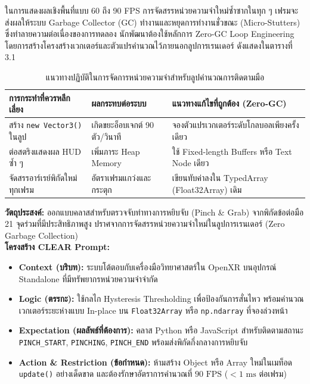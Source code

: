 ในการแสดงผลเชิงพื้นที่แบบ 60 ถึง 90 FPS การจัดสรรหน่วยความจำใหม่ซ้ำซากในทุก ๆ เฟรมจะส่งผลให้ระบบ Garbage Collector (GC) ทำงานและหยุดการทำงานชั่วขณะ (Micro-Stutters) ซึ่งทำลายความต่อเนื่องของการทดลอง นักพัฒนาต้องใช้หลักการ Zero-GC Loop Engineering โดยการสร้างโครงสร้างเวกเตอร์และตัวแปรคำนวณไว้ภายนอกลูปการเรนเดอร์ ดังแสดงในตารางที่ 3.1

\begin{table}[htbp]
\centering
\caption{แนวทางปฏิบัติในการจัดการหน่วยความจำสำหรับลูปคำนวณการติดตามมือ}
\label{tab:zero_gc_rules}
\begin{tabularx}{\textwidth}{lYY}
\toprule
\textbf{การกระทำที่ควรหลีกเลี่ยง} & \textbf{ผลกระทบต่อระบบ} & \textbf{แนวทางแก้ไขที่ถูกต้อง (Zero-GC)} \\
\midrule
สร้าง \texttt{new Vector3()} ในลูป & เกิดขยะอ็อบเจกต์ 90 ตัว/วินาที & จองตัวแปรเวกเตอร์ระดับโกลบอลเพียงครั้งเดียว \\
ต่อสตริงแสดงผล HUD ซ้ำ ๆ & เพิ่มภาระ Heap Memory & ใช้ Fixed-length Buffers หรือ Text Node เดียว \\
จัดสรรอาร์เรย์พิกัดใหม่ทุกเฟรม & อัตราเฟรมแกว่งและกระตุก & เขียนทับค่าลงใน TypedArray (Float32Array) เดิม \\
\bottomrule
\end{tabularx}
\end{table}

\begin{aipromptbox}
\textbf{วัตถุประสงค์:} ออกแบบคลาสสำหรับตรวจจับท่าทางการหยิบจับ (Pinch \& Grab) จากพิกัดข้อต่อมือ 21 จุดร่วมที่มีประสิทธิภาพสูง ปราศจากการจัดสรรหน่วยความจำใหม่ในลูปการเรนเดอร์ (Zero Garbage Collection)\\
\textbf{โครงสร้าง CLEAR Prompt:}
\begin{itemize}[topsep=1pt, itemsep=1pt, leftmargin=1.2em]
    \item \textbf{Context (บริบท):} ระบบโต้ตอบกับเครื่องมือวิทยาศาสตร์ใน OpenXR บนอุปกรณ์ Standalone ที่มีทรัพยากรหน่วยความจำจำกัด
    \item \textbf{Logic (ตรรกะ):} ใช้กลไก Hysteresis Thresholding เพื่อป้องกันการสั่นไหว พร้อมคำนวณเวกเตอร์ระยะห่างแบบ In-place บน \texttt{Float32Array} หรือ \texttt{np.ndarray} ที่จองล่วงหน้า
    \item \textbf{Expectation (ผลลัพธ์ที่ต้องการ):} คลาส Python หรือ JavaScript สำหรับติดตามสถานะ \texttt{PINCH\_START}, \texttt{PINCHING}, \texttt{PINCH\_END} พร้อมส่งพิกัดกึ่งกลางการหยิบจับ
    \item \textbf{Action \& Restriction (ข้อกำหนด):} ห้ามสร้าง Object หรือ Array ใหม่ในเมท็อด \texttt{update()} อย่างเด็ดขาด และต้องรักษาอัตราการคำนวณที่ $90\text{ FPS}$ ($< 1\text{ ms}$ ต่อเฟรม)
\end{itemize}
\end{aipromptbox}

